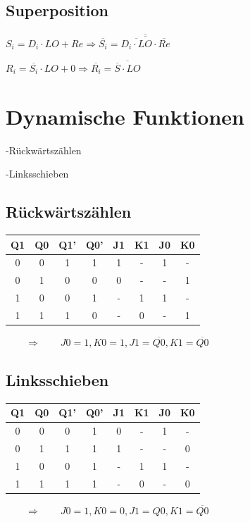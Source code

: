 \documentclass[fleqn]{article}
\begin{document}
\subsection{Superposition}

$S_i = D_i\cdot LO + Re \Rightarrow \overline{S_i} = \overline{\overline{\overline{D_i\cdot LO}\cdot \overline{Re}}}$

\noindent$R_i = \overline{S_i}\cdot LO + 0 \Rightarrow \overline{R_i} = \overline{\overline{S}\cdot LO}$

\section{Dynamische Funktionen}

-Rückwärtszählen

\noindent-Linksschieben

\subsection{Rückwärtszählen}

\begin{center}
    \begin{tabular}{cc|cc|cc|cc}
        Q1&Q0&Q1'&Q0'&J1&K1&J0&K0\\
        \hline
        0&0&1&1&1&-&1&-\\
        0&1&0&0&0&-&-&1\\
        1&0&0&1&-&1&1&-\\
        1&1&1&0&-&0&-&1\\
    \end{tabular}
    $\qquad \Rightarrow \qquad J0=1,K0=1,J1=\overline{Q0},K1=\overline{Q0}$
\end{center}

\subsection{Linksschieben}

\begin{center}
    \begin{tabular}{cc|cc|cc|cc}
        Q1&Q0&Q1'&Q0'&J1&K1&J0&K0\\
        \hline
        0&0&0&1&0&-&1&-\\
        0&1&1&1&1&-&-&0\\
        1&0&0&1&-&1&1&-\\
        1&1&1&1&-&0&-&0
    \end{tabular}
    $\qquad\Rightarrow\qquad J0=1,K0=0,J1=Q0,K1=\overline{Q0}$
\end{center}
\end{document}
